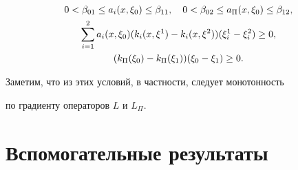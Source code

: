 \begin{gather} %


0 < \beta_{01} \leq a_{i}(x, \xi_{0}) \leq \beta_{11}, \quad


0 < \beta_{02} \leq a_{\Pi}(x, \xi_{0}) \leq \beta_{12}, \notag \\


%




\sum_{i=1}^{2} a_{i}(x, \xi_{0}) (k_{i}(x, \xi^{1}) -


k_{i}(x, \xi^{2}))(\xi_{i}^{1}-\xi_{i}^{2}) \geq 0,\notag \\


%


\label{eq9} 


(k_{\Pi}(\xi_{0})-k_{\Pi}(\xi_{1}))(\xi_{0}-\xi_{1}) \geq 0.


\end{gather}


Заметим, что из этих условий, в частности, следует монотонность 


по градиенту операторов $L$ и $L_{\Pi}$.





\section{Вспомогательные результаты}





